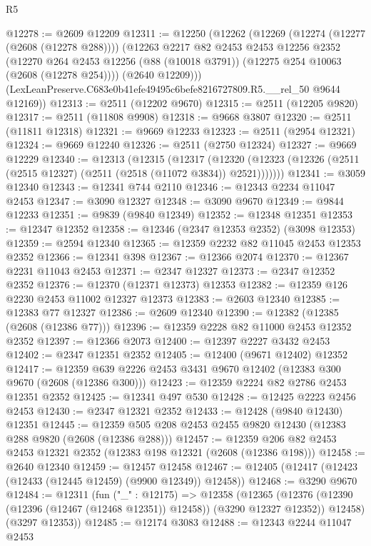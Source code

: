 \begin{lexlean}{R5}
\begin{coremodule}
@12278 := @2609 @12209
@12311 := @12250
    (@12262
      (@12269
        (@12274 (@12277 (@2608 (@12278 @288))))
        (@12263
          @2217
          @82
          @2453
          @2453
          @12256
          @2352
          (@12270 @264 @2453 @12256 (@88 (@10018 @3791)) (@12275 @254 @10063 (@2608 (@12278 @254))))
          (@2640 @12209)))
      (LexLeanPreserve.C683e0b41efe49495c6befe8216727809.R5.__rel_50 @9644 @12169))
@12313 := @2511 (@12202 @9670)
@12315 := @2511 (@12205 @9820)
@12317 := @2511 (@11808 @9908)
@12318 := @9668 @3807
@12320 := @2511 (@11811 @12318)
@12321 := @9669 @12233
@12323 := @2511 (@2954 @12321)
@12324 := @9669 @12240
@12326 := @2511 (@2750 @12324)
@12327 := @9669 @12229
@12340 := @12313
    (@12315
      (@12317
        (@12320 (@12323 (@12326 (@2511 (@2515 @12327) (@2511 (@2518 (@11072 @3834)) @2521)))))))
@12341 := @3059 @12340
@12343 := @12341 @744 @2110
@12346 := @12343 @2234 @11047 @2453
@12347 := @3090 @12327
@12348 := @3090 @9670
@12349 := @9844 @12233
@12351 := @9839 (@9840 @12349)
@12352 := @12348 @12351
@12353 := @12347 @12352
@12358 := @12346 (@2347 @12353 @2352) (@3098 @12353)
@12359 := @2594 @12340
@12365 := @12359 @2232 @82 @11045 @2453 @12353 @2352
@12366 := @12341 @398
@12367 := @12366 @2074
@12370 := @12367 @2231 @11043 @2453
@12371 := @2347 @12327
@12373 := @2347 @12352 @2352
@12376 := @12370 (@12371 @12373) @12353
@12382 := @12359 @126 @2230 @2453 @11002 @12327 @12373
@12383 := @2603 @12340
@12385 := @12383 @77 @12327
@12386 := @2609 @12340
@12390 := @12382 (@12385 (@2608 (@12386 @77)))
@12396 := @12359 @2228 @82 @11000 @2453 @12352 @2352
@12397 := @12366 @2073
@12400 := @12397 @2227 @3432 @2453
@12402 := @2347 @12351 @2352
@12405 := @12400 (@9671 @12402) @12352
@12417 := @12359 @639 @2226 @2453 @3431 @9670 @12402 (@12383 @300 @9670 (@2608 (@12386 @300)))
@12423 := @12359 @2224 @82 @2786 @2453 @12351 @2352
@12425 := @12341 @497 @530
@12428 := @12425 @2223 @2456 @2453
@12430 := @2347 @12321 @2352
@12433 := @12428 (@9840 @12430) @12351
@12445 := @12359 @505 @208 @2453 @2455 @9820 @12430 (@12383 @288 @9820 (@2608 (@12386 @288)))
@12457 := @12359 @206 @82 @2453 @2453 @12321 @2352 (@12383 @198 @12321 (@2608 (@12386 @198)))
@12458 := @2640 @12340
@12459 := @12457 @12458
@12467 := @12405 (@12417 (@12423 (@12433 (@12445 @12459) (@9900 @12349)) @12458))
@12468 := @3290 @9670
@12484 := @12311
    (fun ("_" : @12175) =>
    @12358
      (@12365
        (@12376 (@12390 (@12396 (@12467 (@12468 @12351)) @12458)) (@3290 @12327 @12352))
        @12458)
      (@3297 @12353))
@12485 := @12174 @3083
@12488 := @12343 @2244 @11047 @2453

\end{coremodule}
\end{lexlean}
